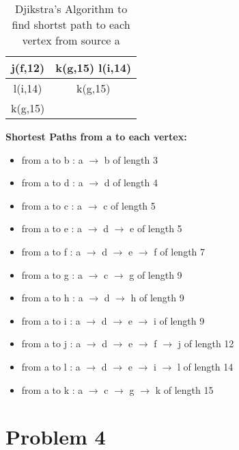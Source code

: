 \documentclass{article}
\begin{document}
\begin{table}[ht]
\begin{tabular}{|c|c|}
        \hline
        j(f,12)                & k(g,15) l(i,14)                                                                                                                      \\
        \hline
        l(i,14)                & k(g,15)                                                                                                                              \\
        \hline
        k(g,15)                &                                                                                                                                      \\
        \hline
    \end{tabular}
    \caption{Djikstra's Algorithm to find shortst path to each vertex from source a}
    \label{tab:table3}
\end{table}
\textbf{Shortest Paths from a to each vertex:}
\begin{itemize}
    \item from a to b : a $\rightarrow$ b of length 3
    \item from a to d : a $\rightarrow$ d of length 4
    \item from a to c : a $\rightarrow$ c of length 5
    \item from a to e : a $\rightarrow$ d $\rightarrow$ e of length 5
    \item from a to f : a $\rightarrow$ d $\rightarrow$ e $\rightarrow$ f of length 7
    \item from a to g : a $\rightarrow$ c $\rightarrow$ g of length 9
    \item from a to h : a $\rightarrow$ d $\rightarrow$ h of length 9
    \item from a to i : a $\rightarrow$ d $\rightarrow$ e $\rightarrow$ i of length 9
    \item from a to j : a $\rightarrow$ d $\rightarrow$ e $\rightarrow$ f $\rightarrow$ j of length 12
    \item from a to l : a $\rightarrow$ d $\rightarrow$ e $\rightarrow$ i $\rightarrow$ l of length 14
    \item from a to k : a $\rightarrow$ c $\rightarrow$ g $\rightarrow$ k of length 15
\end{itemize}
\newpage
\section*{Problem 4}
\end{document}
